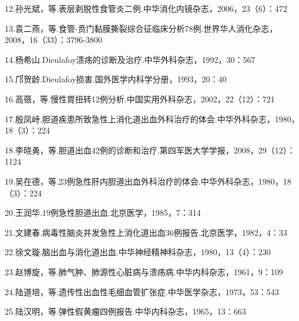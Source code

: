 12.孙光斌，等.表层剥脱性食管炎二例.中华消化内镜杂志，2006，23（6）：472

13.袁二燕，等.食管-贲门黏膜撕裂综合征临床分析78例.世界华人消化杂志，2008，16（33）：3796-3800

14.杨希山.Dieulafoy溃疡的诊断及治疗.中华外科杂志，1992，30：567

15.邝贺龄.Dieulafoy损害.国外医学内科学分册，1993，20：40

16.高蓓，等.慢性胃扭转12例分析.中国实用外科杂志，2002，22（12）：721

17.殷凤峙.胆道疾患所致急性上消化道出血外科治疗的体会.中华外科杂志，1980，18（3）：224

18.李晓勇，等.胆道出血42例的诊断和治疗.第四军医大学学报，2008，29（12）：1124

19.吴在德，等.23例急性肝内胆道出血外科治疗的体会.中华外科杂志，1980，18（3）：224

20.王润华.19例急性胆道出血.北京医学，1985，7：314

21.文建春.病毒性脑炎并发急性上消化道出血36例报告.北京医学，1982，4：33

22.徐文璇.脑出血与消化道出血.中华神经精神科杂志，1980，13（4）：230

23.赵博旋，等.肺气肿、肺源性心脏病与溃疡病.中华内科杂志，1961，9：109

24.陆道培，等.遗传性出血性毛细血管扩张症.中华医学杂志，1973，53：543

25.陆汉明，等.弹性假黄瘤四例报告.中华内科杂志，1965，13：663

\protect\hypertarget{text00173.html}{}{}

